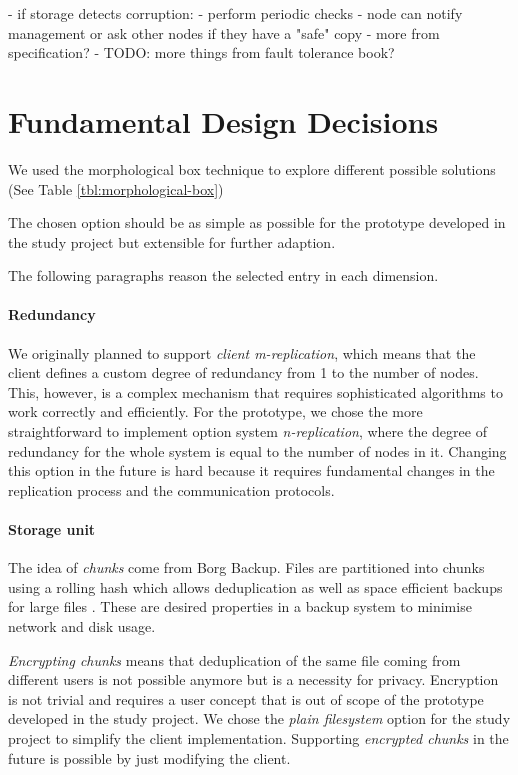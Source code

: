 - if storage detects corruption:
    - perform periodic checks
    - node can notify management or ask other nodes if they have a "safe" copy
- more from specification?
- TODO: more things from fault tolerance book?

\section{Fundamental Design Decisions}

We used the morphological box technique to explore different possible solutions (See Table \ref{tbl:morphological-box})

The chosen option should be as simple as possible for the prototype developed in the study project but extensible for further adaption.

The following paragraphs reason the selected entry in each dimension.

\paragraph{Redundancy} 
We originally planned to support \emph{client m-replication}, which means that the client defines a custom degree of redundancy from 1 to the number of nodes. This, however, is a complex mechanism that requires sophisticated algorithms to work correctly and efficiently. For the prototype, we chose the more straightforward to implement option system \emph{n-replication}, where the degree of redundancy for the whole system is equal to the number of nodes in it. Changing this option in the future is hard because it requires fundamental changes in the replication process and the communication protocols.

\paragraph{Storage unit}
The idea of \emph{chunks} come from Borg Backup. Files are partitioned into chunks using a rolling hash which allows deduplication as well as space efficient backups for large files \cite{borg-data-structures}. These are desired properties in a backup system to minimise network and disk usage.

\emph{Encrypting chunks} means that deduplication of the same file coming from different users is not possible anymore but is a necessity for privacy. Encryption is not trivial and requires a user concept that is out of scope of the prototype developed in the study project.
We chose the \emph{plain filesystem} option for the study project to simplify the client implementation. Supporting \emph{encrypted chunks} in the future is possible by just modifying the client.

